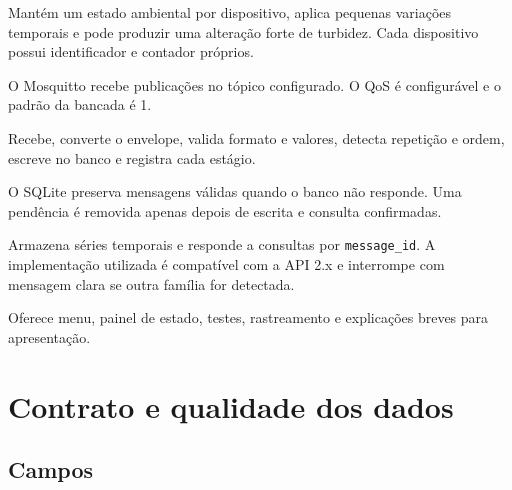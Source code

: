\documentclass[12pt,a4paper]{article}
\newcommand{\code}[1]{\texttt{#1}}
\begin{document}
\begin{description}[style=nextline]
  \item[Simulador] Mantém um estado ambiental por dispositivo, aplica pequenas variações temporais e pode produzir uma alteração forte de turbidez. Cada dispositivo possui identificador e contador próprios.
  \item[MQTT] O Mosquitto recebe publicações no tópico configurado. O QoS é configurável e o padrão da bancada é 1.
  \item[Consumer] Recebe, converte o envelope, valida formato e valores, detecta repetição e ordem, escreve no banco e registra cada estágio.
  \item[Fila local] O SQLite preserva mensagens válidas quando o banco não responde. Uma pendência é removida apenas depois de escrita e consulta confirmadas.
  \item[InfluxDB] Armazena séries temporais e responde a consultas por \code{message\_id}. A implementação utilizada é compatível com a API 2.x e interrompe com mensagem clara se outra família for detectada.
  \item[CLI] Oferece menu, painel de estado, testes, rastreamento e explicações breves para apresentação.
\end{description}

\section{Contrato e qualidade dos dados}

\subsection{Campos}
\end{document}
